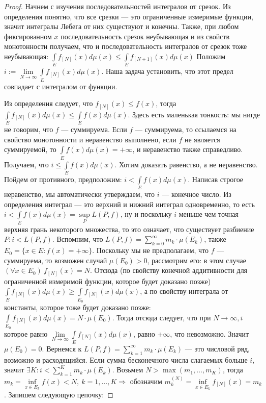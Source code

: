 \begin{proof}
Начнем с изучения последовательностей интегралов от срезок. Из определения понятно, что все срезки --- это ограниченные измеримые функции, значит интегралы Лебега от них существуют и конечны. Также, при любом фиксированном $x$ последовательность срезок неубывающая и из свойств монотонности получаем, что и последовательность интегралов от срезок тоже неубывающая: $\int\limits_{E}f_{[N]}(x)d\mu(x)\leqslant\int\limits_{E}f_{[N+1]}(x)d\mu(x)$
Положим $i:=\lim\limits_{N \to \infty} \int\limits_{E}f_{[N]}(x)d\mu(x)$. Наша задача установить, что этот предел совпадает с интегралом от функции. 

Из определения следует, что $f_{[N]}(x)\leqslant f(x)$, тогда $\int\limits_{E}f_{[N]}(x)d\mu(x)\leqslant\int\limits_{E}f(x)d\mu(x)$. Здесь есть маленькая тонкость: мы нигде не говорим, что $f$ --- суммируема. Если $f$ --- суммируема, то ссылаемся на свойство монотонности и неравенство выполнено, если $f$ не является суммируемой, то $\int\limits_{E}f(x)d\mu(x) = +\infty$, и неравенство также справедливо. Получаем, что $i\leqslant\int\limits_{E}f(x)d\mu(x)$. Хотим доказать  равенство, а не неравенство. Пойдем от противного, предположим: $i<\int\limits_{E}f(x)d\mu(x)$. Написав строгое неравенство, мы автоматически утверждаем, что $i$ --- конечное число. Из определения интеграл --- это верхний и нижний интеграл одновременно, то есть $i<\int\limits_{E}f(x)d\mu(x) = \sup\limits_P L(P, f)$, ну и поскольку $i$ меньше чем точная верхняя грань некоторого множества, то это означает, что существует разбиение ${P: i<L(P, f).}$ Вспомним, что
$L(P, f)=\sum\limits_{k=0}^\infty m_k\cdot \mu(E_k)$, также
$E_0=\{x\in E: f(x)=+\infty\}$. Поскольку мы не предполагаем, что $f$ --- суммируема, то возможен случай $\mu(E_0)>0$, рассмотрим его: в этом случае
$(\forall x \in E_0)\ f_{[N]}(x)=N$. Отсюда (по свойству конечной аддитивности для ограниченной измеримой функции, которое будет доказано позже)\newline
$\int\limits_{E}f_{[N]}(x)d\mu(x)\geqslant\int\limits_{E_0}f_{[N]}(x)d\mu(x)$, а по свойству интеграла от константы, которое тоже будет доказано позже: $\int\limits_{E_0}f_{[N]}(x)d\mu(x)=N\cdot\mu(E_0)$. Тогда отсюда следует, что при $N\to\infty, i$ которое равно $\lim\limits_{N \to \infty} \int\limits_{E}f_{[N]}(x)d\mu(x)$, равно $+\infty$, что невозможно. Значит $\mu(E_0)=0$. Вернемся к $L(P, f)=\sum\limits_{k=1}^\infty m_k\cdot \mu(E_k)$ --- это числовой ряд, возможно и  расходящийся. Если сумма бесконечного числа слагаемых больше $i$, значит $\exists K : i<\sum\limits_{k=1}^Km_k\cdot\mu(E_k)$. Возьмем \newline
$N>\max(m_1, \ldots, m_K)$, тогда $m_k=\inf\limits_{x\in E_k} f(x) < N,\ k =1, \ldots, K \Rightarrow \text{ обозначим } m_k^{(N)}=\inf\limits_{x\in E_k}f_{[N]}(x)=m_k$. Запишем следующую цепочку:


\end{proof}
